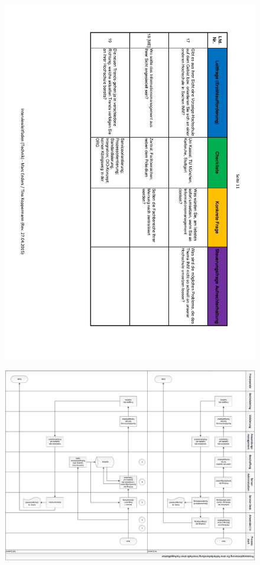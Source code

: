 \begin{figure}
	\centering
	\includegraphics[width=18cm]{kapitel/anhang/Interviewleitfaden_11}
\end{figure}

\begin{landscape}
    \begin{figure}
	    \centering
	    \includegraphics[width=22cm]{kapitel/anhang/prozessoptimierung_gesamt}
	    \label{fig_prozessoptimierung_gesamt}
    \end{figure}
\end{landscape}